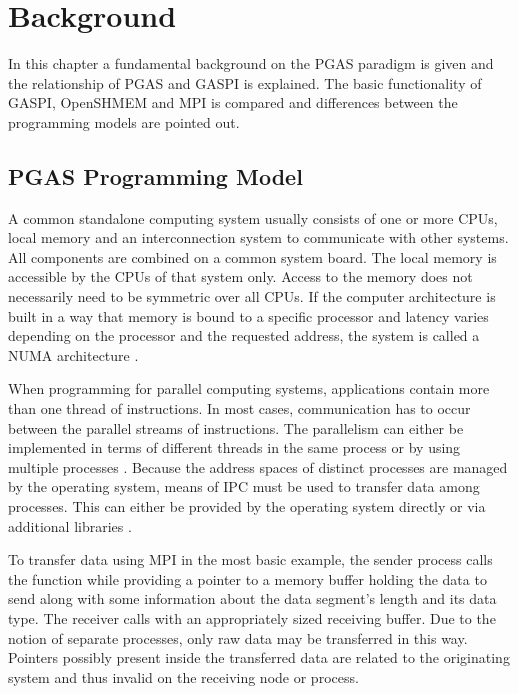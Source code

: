 
\chapter{Background}
\label{ch:background}

In this chapter a fundamental background on the \ac{PGAS} paradigm is given and the relationship of \ac{PGAS} and \ac{GASPI} is explained. The basic functionality of \ac{GASPI}, \ac{OpenSHMEM} and \ac{MPI} is compared and differences between the programming models are pointed out.

\section{\acs{PGAS} Programming Model}

A common standalone computing system usually consists of one or more \acp{CPU}, local memory and an interconnection system to communicate with other systems. All components are combined on a common system board. The local memory is accessible by the \acp{CPU} of that system only. Access to the memory does not necessarily need to be symmetric over all \acp{CPU}. If the computer architecture is built in a way that memory is bound to a specific processor and latency varies depending on the processor and the requested address, the system is called a \ac{NUMA} architecture \cite[ch.~5.1]{carch}.

When programming for parallel computing systems, applications contain more than one thread of instructions. In most cases, communication has to occur between the parallel streams of instructions. The parallelism can either be implemented in terms of different threads in the same process \cite[p.~163\,ff.]{silberschatz} or by using multiple processes \cite[p.~122\,ff.]{silberschatz}. Because the address spaces of distinct processes are managed by the operating system, means of \ac{IPC} must be used to transfer data among processes. This can either be provided by the operating system directly or via additional libraries \cite[p.~130\,ff.]{silberschatz}.

To transfer data using \ac{MPI} in the most basic example, the sender process calls the function  while providing a pointer to a memory buffer holding the data to send along with some information about the data segment's length and its data type. The receiver calls  with an appropriately sized receiving buffer. Due to the notion of separate processes, only raw data may be transferred in this way. Pointers possibly present inside the transferred data are related to the originating system and thus invalid on the receiving node or process. 

